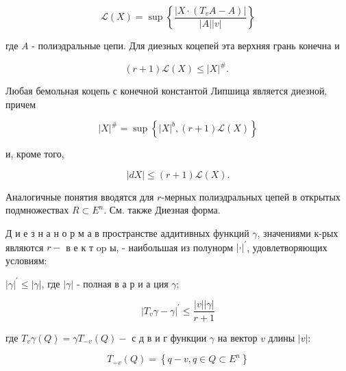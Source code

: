 \documentclass[10pt]{article}
\begin{document}
\[

\mathscr{L}(X)=\sup \left\{\frac{\left|X \cdot\left(T_{v} A-A\right)\right|}{|A||v|}\right\}

\]



где $A$ - полиэдральные цепи. Для диезных коцепей эта верхняя грань конечна и



\[

(r+1) \mathscr{L}(X) \leqslant|X|^{\#} \text {. }

\]



Любая бемольная коцепь с конечной константой Липшица является диезной, причем



\[

|X|^{\#}=\sup \left\{|X|^{b},(r+1) \mathscr{L}(X)\right\}

\]



и, кроме того,



\[

|d X| \leqslant(r+1) \mathscr{L}(X) .

\]



Аналогичные понятия вводятся для $r$-мерных полиэдральных цепей в открытых подмножествах $R \subset E^{n}$. См. также Диезная форма.



Д и е з н а н о р м а в пространстве аддитивных функций $\gamma$, значениями к-рых являются $r-$ в е к т op ы, - наибольшая из полунорм $|\cdot|^{\prime}$, удовлетворяющих условиям:



$|\gamma|^{\prime} \leqslant|\gamma|$, где $|\gamma|$ - полная в а р и а ция $\gamma$;



\[

\left|T_{v} \gamma-\gamma\right|^{\prime} \leqslant \frac{|v||\gamma|}{r+1}

\]



где $T_{v} \gamma(Q)=\gamma T_{-v}(Q)-$ с д в и г функции $\gamma$ на вектор $v$ длины $|v|:$



\[

T_{-v}(Q)=\left\{q-v, q \in Q \subset E^{n}\right\}

\]
\end{document}
